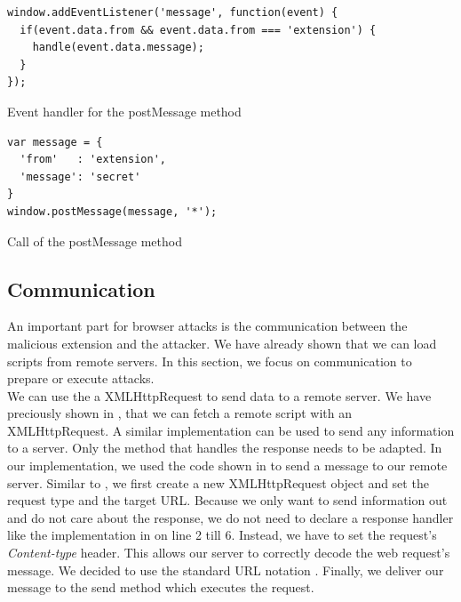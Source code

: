 			\begin{code}
				\begin{lstlisting}
window.addEventListener('message', function(event) {
  if(event.data.from && event.data.from === 'extension') {
    handle(event.data.message);
  }
});
				\end{lstlisting}
				\caption{Event handler for the postMessage method}
				\label{postMessageListener}
			\end{code}
			
			\begin{code}
				\begin{lstlisting}
var message = {
  'from'   : 'extension',
  'message': 'secret'
}
window.postMessage(message, '*');
				\end{lstlisting}
				\caption{Call of the postMessage method}
				\label{postMessageMethod}
			\end{code}
		
		
	
	\subsection{Communication}
	
		An important part for browser attacks is the communication between the malicious extension and the attacker. We have already shown that we can load scripts from remote servers. In this section, we focus on communication to prepare or execute attacks. \\ %
		
		We can use the a XMLHttpRequest to send data to a remote server. We have preciously shown in , that we can fetch a remote script with an XMLHttpRequest. A similar implementation can be used to send any information to a server. Only the method that handles the response needs to be adapted. In our implementation, we used the code shown in  to send a message to our remote server. Similar to , we first create a new XMLHttpRequest object and set the request type and the target URL. Because we only want to send information out and do not care about the response, we do not need to declare a response handler like the implementation in  on line 2 till 6. Instead, we have to set the request's \textit{Content-type} header. This allows our server to correctly decode the web request's message. We decided to use the standard URL notation \cite{w3cUrlSpecifications}. Finally, we deliver our message to the send method which executes the request. 
		
